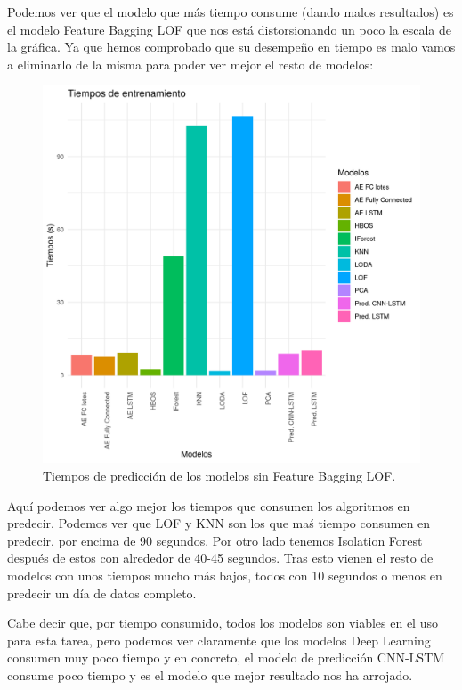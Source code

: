 Podemos ver que el modelo que más tiempo consume (dando malos resultados) es el modelo Feature Bagging LOF que nos está distorsionando un poco la escala de la gráfica. Ya que hemos comprobado que su desempeño en tiempo es malo vamos a eliminarlo de la misma para poder ver mejor el resto de modelos:

\begin{figure}[H]
	\centering
	\includegraphics[scale=0.65]{imagenes/tiempos_prediccion2.png}
	\caption{Tiempos de predicción de los modelos sin Feature Bagging LOF.}
	\label{img:tiempos-prediccion2}
\end{figure}

Aquí podemos ver algo mejor los tiempos que consumen los algoritmos en predecir. Podemos ver que LOF y KNN son los que maś tiempo consumen en predecir, por encima de 90 segundos. Por otro lado tenemos Isolation Forest después de estos con alrededor de 40-45 segundos. Tras esto vienen el resto de modelos con unos tiempos mucho más bajos, todos con 10 segundos o menos en predecir un día de datos completo. 

Cabe decir que, por tiempo consumido, todos los modelos son viables en el uso para esta tarea, pero podemos ver claramente que los modelos Deep Learning consumen muy poco tiempo y en concreto, el modelo de predicción CNN-LSTM consume poco tiempo y es el modelo que mejor resultado nos ha arrojado.

